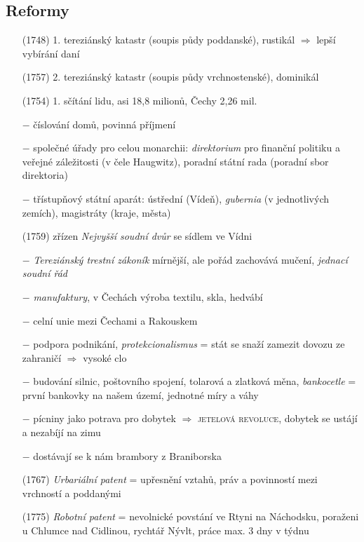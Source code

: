 \documentclass{article}
\begin{document}
\subsection*{Reformy}
\begin{itemize}
    \vspace{-0.5em}
    \setlength\itemsep{0.15em}
    \item[(1748)] 1. tereziánský katastr (soupis půdy poddanské), rustikál $\Rightarrow$ lepší vybírání daní
    \item[(1757)] 2. tereziánský katastr (soupis půdy vrchnostenské), dominikál
    \item[(1754)] 1. sčítání lidu, asi 18,8 milionů, Čechy 2,26 mil.
    \item[$-$] číslování domů, povinná příjmení
    \item[$-$] společné úřady pro celou monarchii: \textit{direktorium} pro finanční politiku a veřejné záležitosti (v čele Haugwitz), poradní státní rada (poradní sbor direktoria)
    \item[$-$] třístupňový státní aparát: ústřední (Vídeň), \textit{gubernia} (v jednotlivých zemích), magistráty (kraje, města)
    \item[(1759)] zřízen \textit{Nejvyšší soudní dvůr} se sídlem ve Vídni
    \item[$-$] \textit{Tereziánský trestní zákoník} mírnější, ale pořád zachovává mučení, \textit{jednací soudní řád}
    \item[$-$] \textit{manufaktury}, v Čechách výroba textilu, skla, hedvábí
    \item[$-$] celní unie mezi Čechami a Rakouskem
    \item[$-$] podpora podnikání, \textit{protekcionalismus} = stát se snaží zamezit dovozu ze zahraničí $\Rightarrow$ vysoké clo
    \item[$-$] budování silnic, poštovního spojení, tolarová a zlatková měna, \textit{bankocetle} = první bankovky na našem území, jednotné míry a váhy
    \item[$-$] pícniny jako potrava pro dobytek $\Rightarrow$ \textsc{jetelová revoluce}, dobytek se ustájí a nezabíjí na zimu
    \item[$-$] dostávají se k nám brambory z Braniborska
    \item[(1767)] \textit{Urbariální patent} = upřesnění vztahů, práv a povinností mezi vrchností a poddanými
    \item[(1775)] \textit{Robotní patent} = nevolnické povstání ve Rtyni na Náchodsku, poraženi u Chlumce nad Cidlinou, rychtář Nývlt, práce max. 3 dny v týdnu

\end{itemize}
\end{document}
